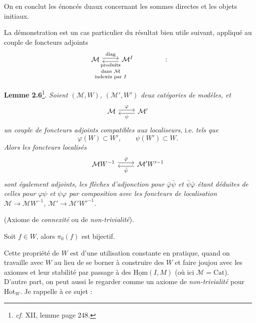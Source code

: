 \documentclass[11pt]{article}
\newcommand{\msp}[1]{\marginpar{\footnotesize [#1]}}
\begin{document}
\msp{page 11}On en conclut les énoncés duaux concernant les sommes directes et les objets initiaux.

La démonstration est un cas particulier du résultat bien utile suivant, appliqué au couple de foncteurs adjoints
\[
\begin{tikzcd}
\mathcal{M} \arrow[r, shift left, "\mathrm{diag}"] & \mathcal{M}^I \arrow[l, shift left, "\text{\scriptsize\shortstack{produits\\ dans $\mathcal{M}$\\ indexés par $I$}}"]
\end{tikzcd}
\qquad\qquad :
\]

\textbf{Lemme 2.6}\footnote{\textit{cf.} XII, lemme page 248.}. \textit{Soient $(\mathcal{M}, W)$, $(\mathcal{M}', W')$ deux catégories de modèles, et}
\[
\begin{tikzcd}
\mathcal{M} \arrow[r, shift left, "\varphi"] & \mathcal{M}' \arrow[l, shift left, "\psi"]
\end{tikzcd}
\]
\textit{un couple de foncteurs adjoints compatibles aux localiseurs,} i.e. \textit{tels que}
\[
\varphi(W) \subset W', \qquad \psi(W') \subset W.
\]
\textit{Alors les foncteurs localisés}
\[
\begin{tikzcd}
\mathcal{M}W^{-1} \arrow[r, shift left, "\bar{\varphi}"] & \mathcal{M}'W'^{-1} \arrow[l, shift left, "\bar{\psi}"]
\end{tikzcd}
\]
\textit{sont également adjoints, les flèches d'adjonction pour $\bar{\varphi}\bar{\psi}$ et $\bar{\psi}\bar{\varphi}$ étant déduites de celles pour $\varphi\psi$ et $\psi\varphi$ par composition avec les foncteurs de localisation $\mathcal{M} \longrightarrow \mathcal{M}W^{-1}$, $\mathcal{M}' \longrightarrow \mathcal{M}'W'^{-1}$.}

\begin{description}[leftmargin=7em, labelwidth=6em]
\item[Loc (5)] \msp{page 12}(Axiome de \textit{connexité} ou de \textit{non-trivialité}).

Soit $f \in W$, alors $\pi_0(f)$ est bijectif.
\end{description}

Cette propriété de $W$ est d'une utilisation constante en pratique, quand on travaille avec $W$ au lieu de se borner à construire des $W$ et faire joujou avec les axiomes et leur stabilité par passage à des $\underline{\mathrm{Hom}}(I, M)$ (où ici $\mathcal{M} = \mathrm{Cat}$). D'autre part, on peut aussi le regarder comme un axiome de \textit{non-trivialité} pour $\mathrm{Hot}_W$. Je rappelle à ce sujet :
\end{document}
